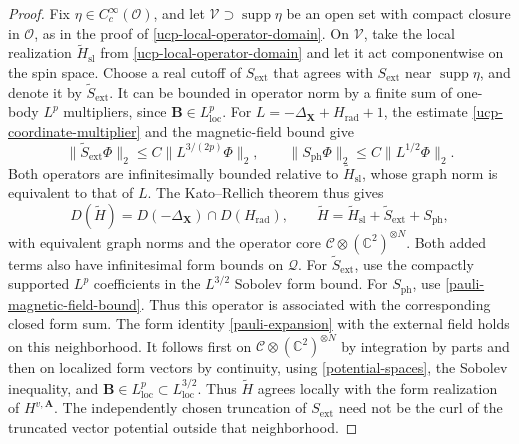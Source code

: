 \documentclass[final,reqno]{amsart}
\DeclareMathOperator{\supp}{supp}
\theoremstyle{remark}
\newcommand{\CC}{\mathbb{C}}
\newcommand{\DC}{D}
\newcommand{\rad}{\mathrm{rad}}
\newcommand{\vA}{{\mathbf{A}}}
\newcommand{\vB}{{\mathbf{B}}}
\newcommand{\vX}{{\mathbf{X}}}
\begin{document}
\begin{proof}
Fix $\eta\in C_c^\infty(\mathcal O)$, and let $\mathcal V\supset\supp\eta$
be an open set with compact closure in $\mathcal O$, as in the proof of
\cref{ucp-local-operator-domain}.
On $\mathcal V$, take the local realization
$\widetilde H_{\mathrm{sl}}$ from \cref{ucp-local-operator-domain} and let it
act componentwise on the spin space.  Choose a real cutoff of $S_{\mathrm{ext}}$
that agrees with $S_{\mathrm{ext}}$ near $\supp\eta$, and denote it by
$\widetilde S_{\mathrm{ext}}$.  It can be
bounded in operator norm by a finite sum of one-body $L^p$
multipliers, since $\vB\in L^p_{\mathrm{loc}}$.
For $L=-\Delta_{\vX}+H_\rad+1$, the estimate
\cref{ucp-coordinate-multiplier} and the magnetic-field bound give
\[
 \|\widetilde S_{\mathrm{ext}}\Phi\|_2
       \leq C\|L^{3/(2p)}\Phi\|_2,
 \qquad
 \|S_{\mathrm{ph}}\Phi\|_2
       \leq C\|L^{1/2}\Phi\|_2.
\]
Both operators are infinitesimally bounded relative to
$\widetilde H_{\mathrm{sl}}$, whose graph norm is equivalent to that of $L$.
The Kato--Rellich theorem \cite[Theorem~V.4.3]{kato1995perturbation}
thus gives
\begin{equation}\label{pauli-local-domain}
 \DC(\widetilde H)
 =\DC(-\Delta_{\vX})\cap\DC(H_\rad),
 \qquad
 \widetilde H
 =\widetilde H_{\mathrm{sl}}+\widetilde S_{\mathrm{ext}}+S_{\mathrm{ph}},
\end{equation}
with equivalent graph norms and the operator core
$\mathcal C\otimes(\CC^2)^{\otimes N}$.  Both added terms
also have infinitesimal form bounds on $\mathcal Q$.
For $\widetilde S_{\mathrm{ext}}$, use the compactly supported
$L^p$ coefficients in the $L^{3/2}$ Sobolev form bound.
For $S_{\mathrm{ph}}$, use \cref{pauli-magnetic-field-bound}.
Thus this operator is associated with the corresponding closed form
sum.  The form identity \cref{pauli-expansion}
with the external field holds on this neighborhood.  It follows first on
$\mathcal C\otimes(\CC^2)^{\otimes N}$ by integration by parts and then on localized form vectors by
continuity, using \cref{potential-spaces}, the
Sobolev inequality, and $\vB\in L^p_{\mathrm{loc}}\subset
L^{3/2}_{\mathrm{loc}}$.
Thus $\widetilde H$ agrees locally with the form
realization of $H^{v,\vA}$.  The independently chosen
truncation of $S_{\mathrm{ext}}$ need not be the curl of the truncated
vector potential outside that neighborhood.


\end{proof}
\end{document}
